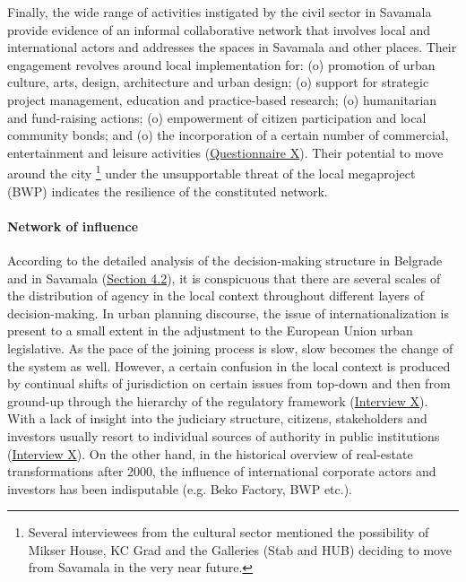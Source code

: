 \documentclass[11pt]{report}
\begin{document}
Finally, the wide range of activities instigated by the civil sector in Savamala provide evidence of an informal collaborative network that involves local and international actors and addresses the spaces in Savamala and other places. Their engagement revolves around local implementation for:  (o) promotion of urban culture, arts, design, architecture and urban design; (o) support for strategic project management, education and practice-based research; (o) humanitarian and fund-raising actions; (o) empowerment of citizen participation and local community bonds; and (o) the incorporation of a certain number of commercial, entertainment and leisure activities 
(\href{Questionnaire Students Savamala}{Questionnaire X}).
Their potential to move around the city
\footnote{Several interviewees from the cultural sector mentioned the possibility of Mikser House, KC Grad and the Galleries (Stab and HUB) deciding to move from Savamala in the very near future.}
under the unsupportable threat of the local megaproject (BWP) indicates the resilience of the constituted network.  

\paragraph{Network of influence}

According to the detailed analysis of the decision-making structure in Belgrade and in Savamala (\href{Section 4.2}{Section 4.2}), it is conspicuous that there are several scales of the distribution of agency in the local context throughout different layers of decision-making.
In urban planning discourse, the issue of internationalization is present to a small extent in the adjustment to the European Union urban legislative. As the pace of the joining process is slow, slow becomes the change of the system as well. 
However, a certain confusion in the local context is produced by continual shifts of jurisdiction on certain issues from top-down and then from ground-up through the hierarchy of the regulatory framework (\href{InterviewX}{Interview X}).
With a lack of insight into the judiciary structure, citizens, stakeholders and investors usually resort to individual sources of authority in public institutions (\href{InterviewX}{Interview X}).
On the other hand, in the historical overview of real-estate transformations after 2000, the influence of international corporate actors and investors has been indisputable (e.g. Beko Factory, BWP etc.).
\end{document}
